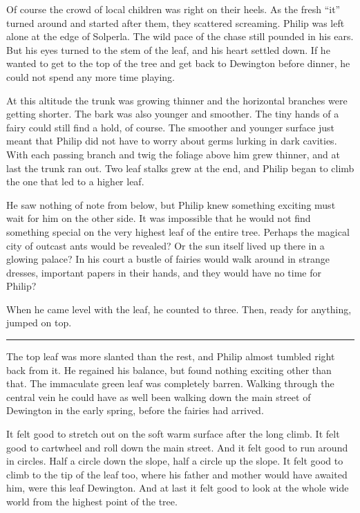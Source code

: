 \documentclass[10pt, draft]{memoir}
\renewcommand{\pfbreakdisplay}{\bigskip \ding{166} \bigskip}
\newcommand{\secbreak}{\fancybreak{\pfbreakdisplay}}
\begin{document}
Of course the crowd of local children was right on their heels. As the fresh ``it'' turned around and started after them, they scattered screaming. Philip was left alone at the edge of Solperla. The wild pace of the chase still pounded in his ears. But his eyes turned to the stem of the leaf, and his heart settled down. If he wanted to get to the top of the tree and get back to Dewington before dinner, he could not spend any more time playing.

At this altitude the trunk was growing thinner and the horizontal branches were getting shorter. The bark was also younger and smoother. The tiny hands of a fairy could still find a hold, of course. The smoother and younger surface just meant that Philip did not have to worry about germs lurking in dark cavities. With each passing branch and twig the foliage above him grew thinner, and at last the trunk ran out. Two leaf stalks grew at the end, and Philip began to climb the one that led to a higher leaf.

He saw nothing of note from below, but Philip knew something exciting must wait for him on the other side. It was impossible that he would not find something special on the very highest leaf of the entire tree. Perhaps the magical city of outcast ants would be revealed? Or the sun itself lived up there in a glowing palace? In his court a bustle of fairies would walk around in strange dresses, important papers in their hands, and they would have no time for Philip?

When he came level with the leaf, he counted to three. Then, ready for anything, jumped on top.

\secbreak

The top leaf was more slanted than the rest, and Philip almost tumbled right back from it. He regained his balance, but found nothing exciting other than that. The immaculate green leaf was completely barren. Walking through the central vein he could have as well been walking down the main street of Dewington in the early spring, before the fairies had arrived.

It felt good to stretch out on the soft warm surface after the long climb. It felt good to cartwheel and roll down the main street. And it felt good to run around in circles. Half a circle down the slope, half a circle up the slope. It felt good to climb to the tip of the leaf too, where his father and mother would have awaited him, were this leaf Dewington. And at last it felt good to look at the whole wide world from the highest point of the tree.
\end{document}
